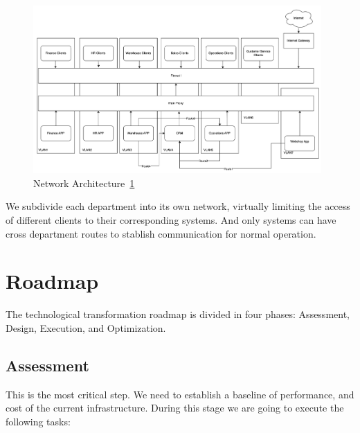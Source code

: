 \documentclass{llncs}
\begin{document}
\begin{figure}[htbp]
  \begin{center}
    \includegraphics[width=11cm]{diagrams/network_architecture.png}
    \caption{Network Architecture~\ref{Network_Architecture}}
    \label{Network_Architecture} %
  \end{center}
\end{figure}

We subdivide each department into its own network, virtually limiting the access of different clients to their corresponding systems. And only systems can have cross department routes to stablish communication for normal operation. 

\section{Roadmap}

The technological transformation roadmap is divided in four phases: Assessment, Design, Execution, and Optimization.

\subsection{Assessment}
This is the most critical step. We need to establish a baseline of performance, and cost of the current infrastructure. During this stage we are going to execute the following tasks:
\end{document}
